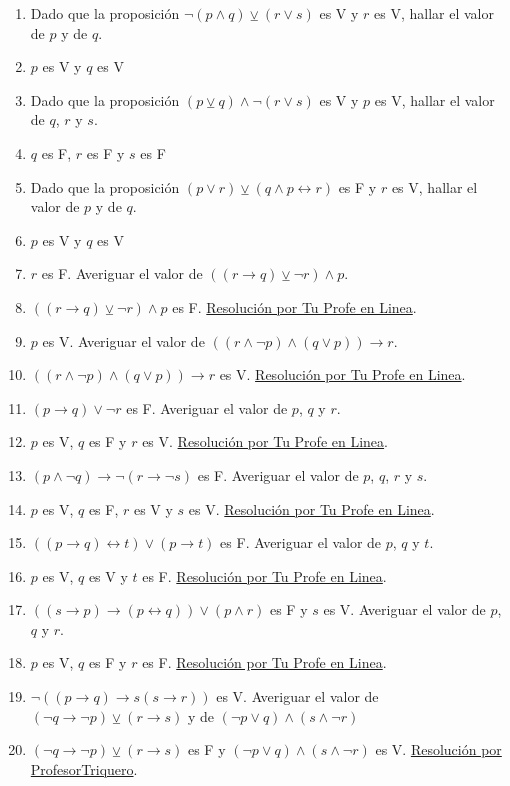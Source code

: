 \documentclass[a4paper]{article}
\newcommand{\answer}{\item[**]}
\newcommand{\then}{\to}
\newcommand{\eq}{\leftrightarrow}
\newcommand{\xor}{\veebar}
\begin{document}
\begin{enumerate}
\begin{enumerate} [label=(\alph*)]
		\item Dado que la proposición $\neg (p\land q) \xor  (r\lor s)$ es V  y $r$ es V, hallar el valor de $p$ y de $q$. 
		\answer $p$ es V y $q$ es V

		\item Dado que la proposición $(p\xor q) \land  \neg (r\lor s)$ es V  y $p$ es V, hallar el valor de $q$, $r$ y $s$. 
		\answer $q$ es F, $r$ es F y $s$ es F

		\item Dado que la proposición $(p\lor r) \xor  (q\land p \eq r)$ es F  y $r$ es V, hallar el valor de $p$ y de $q$. 
		\answer $p$ es V y $q$ es V

		\item $r$ es F. Averiguar el valor de $((r \then q) \xor \neg r) \land p$.
		\answer $((r \then q) \xor \neg r) \land p$ es F. \href{https://youtu.be/bitBrw1NvNk?t=663}{Resolución por Tu Profe en Linea}.

		\item $p$ es V. Averiguar el valor de $((r \land \neg p) \land (q \lor p)) \then r$.
		\answer $((r \land \neg p) \land (q \lor p)) \then r$ es V. \href{https://youtu.be/bitBrw1NvNk?t=793}{Resolución por Tu Profe en Linea}.

		\item $(p \then q) \lor \neg r$ es F. Averiguar el valor de $p$, $q$ y $r$.
		\answer $p$ es V, $q$ es F y $r$ es V. \href{https://youtu.be/bitBrw1NvNk}{Resolución por Tu Profe en Linea}.

		\item $(p \land \neg q) \then \neg (r \then \neg s)$ es F. Averiguar el valor de $p$, $q$, $r$ y $s$.
		\answer $p$ es V, $q$ es F, $r$ es V y $s$ es V. \href{https://youtu.be/bitBrw1NvNk?t=140}{Resolución por Tu Profe en Linea}.

		\item $((p \then q) \eq t) \lor (p \then t)$ es F. Averiguar el valor de $p$, $q$ y $t$.
		\answer $p$ es V, $q$ es V y $t$ es F. \href{https://youtu.be/bitBrw1NvNk?t=273}{Resolución por Tu Profe en Linea}.

		\item $((s \then p) \then (p \eq q)) \lor (p \land r)$ es F y $s$ es V. Averiguar el valor de $p$, $q$ y $r$.
		\answer $p$ es V, $q$ es F y $r$ es F. \href{https://youtu.be/bitBrw1NvNk?t=465}{Resolución por Tu Profe en Linea}.

		\item $\neg \left( (p \then q) \to s(s \then r)\right)$ es V. Averiguar el valor de $(\neg q \then \neg p) \xor (r \then s)$ y de $(\neg p \lor q) \land (s \land \neg r)$
		\answer $(\neg q \then \neg p) \xor (r \then s)$ es F y $(\neg p \lor q) \land (s \land \neg r)$ es V. \href{https://youtu.be/p005yi28rgk}{Resolución por ProfesorTriquero}.


\end{enumerate}
\end{enumerate}
\end{document}
